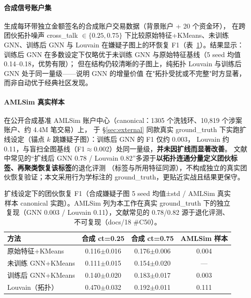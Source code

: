 \documentclass[12pt,a4paper]{ctexart}
\begin{document}
\paragraph{合成信号账户集}
生成每环带独立金额签名的合成账户交易数据（背景账户 + 20 个资金环），
在跨团伙拓扑噪声 cross\_talk $\in \{0.25,0.75\}$ 下比较原始特征+KMeans、未训练 GNN、训练后 GNN 与 Louvain
在嫌疑子图上的环恢复 F1（表~\ref{tab:refinement}）。结果显示：训练后 GNN 在多数设定下仅略优于未训练 GNN 与原始特征基线（5 seed 均值 0.14–0.18，优势有限）；
但在结构仍较清晰的子图上，纯拓扑 Louvain 与训练后 GNN 处于同一量级——说明 GNN 的增量价值
在"拓扑受扰或不完整"时方显著，而非自动优于经典社区发现。

\paragraph{AMLSim 真实样本}
在公开合成基准 AMLSim 账户中心（canonical：1305 个洗钱环、10{,}819 个涉案账户、约 4.4M 笔交易）上，
于 §\ref{sec:external} 同款真实 ground\_truth 下实跑扩线设定（锚点 $k$ 跳嫌疑子图）：训练后 GNN 的 F1 仅约 0.003，
Louvain 约 0.11，与盲扫全图基线（F1$\approx$0.002）处同一量级，\textbf{并未因扩线而显著改善}。
文献中常见的“扩线后 GNN 0.78 / Louvain 0.82”多源于\textbf{以拓扑连通分量定义团伙标签、再聚类恢复该标签}的退化评测
（标签与所用特征同源），不构成独立的真实团伙恢复验证；本文采用行为学标注的 ground\_truth，更贴近实战且结果更保守。

\begin{table}[htbp]
  \centering
  \caption{扩线设定下的团伙恢复 F1（合成嫌疑子图 5 seed 均值±std / AMLSim 真实样本 canonical 实跑）。AMLSim 列为本工作在真实 ground\_truth 下的独立复现（GNN 0.003 / Louvain 0.11），文献常见的 0.78/0.82 源于退化评测、不可复现（docs/18 \#C50）。}
  \label{tab:refinement}
  \begin{tabular}{lccc}
    \toprule
    方法 & 合成 ct=0.25 & 合成 ct=0.75 & AMLSim 样本 \\
    \midrule
    原始特征+KMeans   & 0.116$\pm$0.016 & 0.176$\pm$0.006 & 0.004 \\
    未训练 GNN+KMeans & 0.111$\pm$0.015 & 0.154$\pm$0.020 & ---   \\
    训练后 GNN+KMeans & 0.140$\pm$0.020 & 0.183$\pm$0.017 & 0.003 \\
    Louvain（拓扑）   & 0.470$\pm$0.032 & 0.192$\pm$0.011 & 0.111 \\
    \bottomrule
  \end{tabular}
\end{table}
\end{document}
